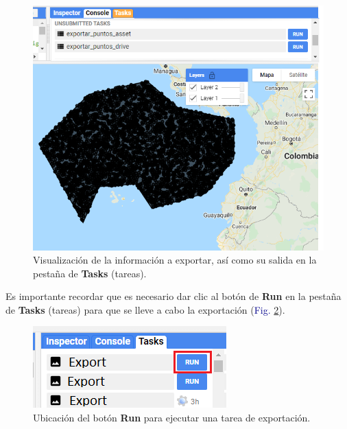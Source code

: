 \documentclass[
  12pt,
  letterpaper,
  twoside]{book}
\begin{document}
\begin{figure}[H]

{\centering \includegraphics[width=0.95\linewidth]{Img/ej26} 

}

\caption{Visualización de la información a exportar, así como su salida en la pestaña de \textbf{Tasks} (tareas).}\label{fig:f814}
\end{figure}

Es importante recordar que es necesario dar clic al botón de \textbf{Run} en la pestaña de \textbf{Tasks} (tareas) para que se lleve a cabo la exportación (\textcolor{darkblue}{Fig.} \ref{fig:f815}).



\begin{figure}[H]

{\centering \includegraphics[width=0.8\linewidth]{Img/boton_run} 

}

\caption{Ubicación del botón \textbf{Run} para ejecutar una tarea de exportación.}\label{fig:f815}
\end{figure}
\end{document}
